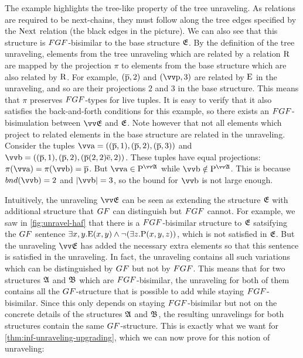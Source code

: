 \noindent
The example highlights the tree-like property of the tree unraveling.
As relations are required to be next-chains, they must follow along the tree edges specified by the $\mathrm{Next}$ relation (the black edges in the picture).
We can also see that this structure is $\FGF$-bisimilar to the base structure ${\mathfrak{E}}$.
By the definition of the tree unraveling, elements from the tree unraveling which are related by a relation $\mathrm{R}$ are mapped by the projection $\pi$ to elements from the base structure which are also related by $\mathrm{R}$.
For example, $(\overline{\mathrm{p}}, 2)$ and $(\elemtuptuplep, 3)$ are related by $\mathrm{E}$ in the unraveling, and so are their projections $2$ and $3$ in the base structure.
This means that $\pi$ preserves $\FGF$-types for live tuples.
It is easy to verify that it also satisfies the back-and-forth conditions for this example, so there exists an $\FGF$-bisimulation between $\unravel{E}$ and ${\mathfrak{E}}$.
Note however that not all elements which project to related elements in the base structure are related in the unraveling.
Consider the tuples $\elemtuptuplea = ((\elemtuplep, 1), (\elemtuplep, 2), (\elemtuplep, 3))$ and $\elemtuptupleb = ((\elemtuplep, 1), (\elemtuplep, 2), (\elemtuplep(2,2)\elemtuplee, 2))$.
These tuples have equal projections: $\pi(\elemtuptuplea) = \pi(\elemtuptupleb) = \elemtuplep$.
But $\elemtuptuplea \in \relP^{\unravel{A}}$ while $\elemtuptupleb \notin \relP^{\unravel{A}}$.
This is because $\bound{\elemtuptupleb} = 2$ and $|\elemtuptupleb| = 3$, so the bound for $\elemtuptupleb$ is not large enough.

Intuitively, the unraveling $\unravel{E}$ can be seen as extending the structure ${\mathfrak{E}}$ with additional structure that $\GF$ can distinguish but $\FGF$ cannot.
For example, we saw in \cref{fig:unravel-haf} that there is a $\FGF$-bisimilar structure to ${\mathfrak{E}}$ satsifying the $\GF$ sentence $\exists{x,y}. \mathrm{E}(x,y) \land \lnot (\exists z. \mathrm{P}(x,y,z))$, which is not satisfied in ${\mathfrak{E}}$.
But the unraveling $\unravel{E}$ has added the necessary extra elements so that this sentence is satisfied in the unraveling.
In fact, the unraveling contains all such variations which can be distinguished by $\GF$ but not by $\FGF$.
This means that for two structures ${\mathfrak{A}}$ and ${\mathfrak{B}}$ which are $\FGF$-bisimilar, the unraveling for both of them contains all the $\GF$-structure that is possible to add while staying $\FGF$-bisimilar.
Since this only depends on staying $\FGF$-bisimilar but not on the concrete details of the structures ${\mathfrak{A}}$ and ${\mathfrak{B}}$, the resulting unravelings for both structures contain the same $\GF$-structure.
This is exactly what we want for \cref{thm:inf-unraveling-upgrading}, which we can now prove for this notion of unraveling:

